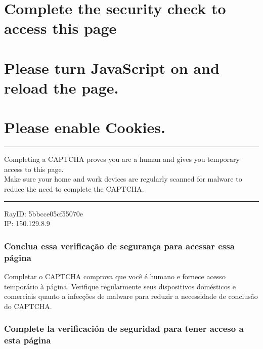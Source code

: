 \hypertarget{complete-the-security-check-to-access-this-page}{%
\section{Complete the security check to access this
page}\label{complete-the-security-check-to-access-this-page}}

\hypertarget{please-turn-javascript-on-and-reload-the-page}{%
\section{Please turn JavaScript on and reload the
page.}\label{please-turn-javascript-on-and-reload-the-page}}

\hypertarget{please-enable-cookies}{%
\section{Please enable Cookies.}\label{please-enable-cookies}}

\begin{center}\rule{0.5\linewidth}{\linethickness}\end{center}

Completing a CAPTCHA proves you are a human and gives you temporary
access to this page.\\
Make sure your home and work devices are regularly scanned for malware
to reduce the need to complete the CAPTCHA.

\begin{center}\rule{0.5\linewidth}{\linethickness}\end{center}

RayID: 5bbcce05cf55070e\\
IP: 150.129.8.9

\hypertarget{conclua-essa-verificauxe7uxe3o-de-seguranuxe7a-para-acessar-essa-puxe1gina}{%
\subsubsection{Conclua essa verificação de segurança para acessar essa
página}\label{conclua-essa-verificauxe7uxe3o-de-seguranuxe7a-para-acessar-essa-puxe1gina}}

Completar o CAPTCHA comprova que você é humano e fornece acesso
temporário à página. Verifique regularmente seus dispositivos domésticos
e comerciais quanto a infecções de malware para reduzir a necessidade de
conclusão do CAPTCHA.

\hypertarget{complete-la-verificaciuxf3n-de-seguridad-para-tener-acceso-a-esta-puxe1gina}{%
\subsubsection{Complete la verificación de seguridad para tener acceso a
esta
página}\label{complete-la-verificaciuxf3n-de-seguridad-para-tener-acceso-a-esta-puxe1gina}}

